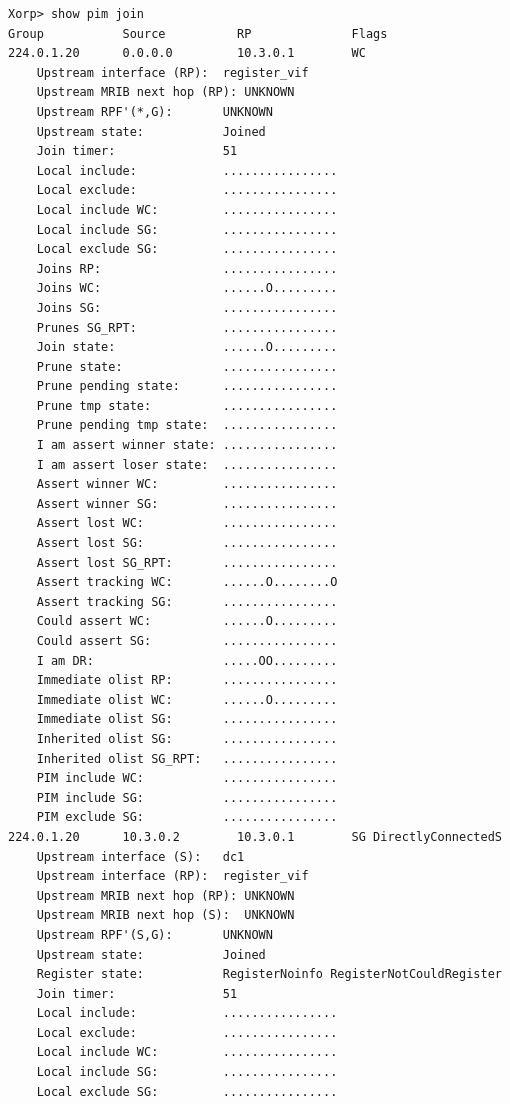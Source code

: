 \documentclass[11pt]{report}
\begin{document}
\begin{itemize}
\begin{verbatim}
Xorp> show pim join 
Group           Source          RP              Flags
224.0.1.20      0.0.0.0         10.3.0.1        WC   
    Upstream interface (RP):  register_vif
    Upstream MRIB next hop (RP): UNKNOWN
    Upstream RPF'(*,G):       UNKNOWN
    Upstream state:           Joined 
    Join timer:               51
    Local include:            ................
    Local exclude:            ................
    Local include WC:         ................
    Local include SG:         ................
    Local exclude SG:         ................
    Joins RP:                 ................
    Joins WC:                 ......O.........
    Joins SG:                 ................
    Prunes SG_RPT:            ................
    Join state:               ......O.........
    Prune state:              ................
    Prune pending state:      ................
    Prune tmp state:          ................
    Prune pending tmp state:  ................
    I am assert winner state: ................
    I am assert loser state:  ................
    Assert winner WC:         ................
    Assert winner SG:         ................
    Assert lost WC:           ................
    Assert lost SG:           ................
    Assert lost SG_RPT:       ................
    Assert tracking WC:       ......O........O
    Assert tracking SG:       ................
    Could assert WC:          ......O.........
    Could assert SG:          ................
    I am DR:                  .....OO.........
    Immediate olist RP:       ................
    Immediate olist WC:       ......O.........
    Immediate olist SG:       ................
    Inherited olist SG:       ................
    Inherited olist SG_RPT:   ................
    PIM include WC:           ................
    PIM include SG:           ................
    PIM exclude SG:           ................
224.0.1.20      10.3.0.2        10.3.0.1        SG DirectlyConnectedS 
    Upstream interface (S):   dc1
    Upstream interface (RP):  register_vif
    Upstream MRIB next hop (RP): UNKNOWN
    Upstream MRIB next hop (S):  UNKNOWN
    Upstream RPF'(S,G):       UNKNOWN
    Upstream state:           Joined 
    Register state:           RegisterNoinfo RegisterNotCouldRegister 
    Join timer:               51
    Local include:            ................
    Local exclude:            ................
    Local include WC:         ................
    Local include SG:         ................
    Local exclude SG:         ................

\end{verbatim}
\end{itemize}
\end{document}

